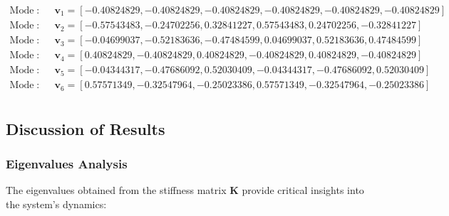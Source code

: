 \documentclass[12pt]{report} %
\begin{document}
\[
\begin{aligned}
\text{Mode 1}: & \quad \mathbf{v}_1 = [-0.40824829, -0.40824829, -0.40824829, -0.40824829, -0.40824829, -0.40824829] \\
\text{Mode 2}: & \quad \mathbf{v}_2 = [-0.57543483, -0.24702256,  0.32841227,  0.57543483,  0.24702256, -0.32841227] \\
\text{Mode 3}: & \quad \mathbf{v}_3 = [-0.04699037, -0.52183636, -0.47484599,  0.04699037,  0.52183636,  0.47484599] \\
\text{Mode 4}: & \quad \mathbf{v}_4 = [ 0.40824829, -0.40824829,  0.40824829, -0.40824829,  0.40824829, -0.40824829] \\
\text{Mode 5}: & \quad \mathbf{v}_5 = [-0.04344317, -0.47686092,  0.52030409, -0.04344317, -0.47686092,  0.52030409] \\
\text{Mode 6}: & \quad \mathbf{v}_6 = [ 0.57571349, -0.32547964, -0.25023386,  0.57571349, -0.32547964, -0.25023386] \\
\end{aligned}
\]

\subsection{Discussion of Results}
\label{subsec:part2_task2_discussion}

\subsubsection{Eigenvalues Analysis}
\label{subsubsec:part2_task2_eigenvalues_discussion}

The eigenvalues obtained from the stiffness matrix \( \mathbf{K} \) provide critical insights into the system's dynamics:
\end{document}
